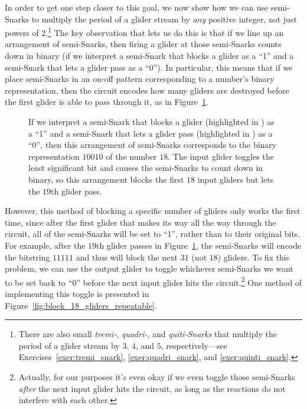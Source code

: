 In order to get one step closer to this goal, we now show how we can use semi-Snarks to multiply the period of a glider stream by \emph{any} positive integer, not just powers of $2$.\footnote{There are also small \emph{tremi-}, \emph{quadri-}, and \emph{quiti-Snarks} that multiply the period of a glider stream by $3$, $4$, and $5$, respectively---see Exercises~\ref{exer:tremi_snark}, \ref{exer:quadri_snark}, and \ref{exer:quinti_snark}.} The key observation that lets us do this is that if we line up an arrangement of semi-Snarks, then firing a glider at those semi-Snarks counts down in binary (if we interpret a semi-Snark that blocks a glider as a ``1'' and a semi-Snark that lets a glider pass as a ``0''). In particular, this means that if we place semi-Snarks in an on-off pattern corresponding to a number's binary representation, then the circuit encodes how many gliders are destroyed before the first glider is able to pass through it, as in Figure~\ref{fig:block_18_gliders}.

\begin{figure}[!htb]
	\centering
	\caption{If we interpret a semi-Snark that blocks a glider (highlighted in ) as a ``1'' and a semi-Snark that lets a glider pass (highlighted in ) as a ``0'', then this arrangement of semi-Snarks corresponds to the binary representation $10010$ of the number $18$. The input glider toggles the least significant bit and causes the semi-Snarks to count down in binary, so this arrangement blocks the first $18$ input gliders but lets the $19$th glider pass.}
	\label{fig:block_18_gliders}
\end{figure}

However, this method of blocking a specific number of gliders only works the first time, since after the first glider that makes its way all the way through the circuit, all of the semi-Snarks will be set to ``1'', rather than to their original bits. For example, after the $19$th glider passes in Figure~\ref{fig:block_18_gliders}, the semi-Snarks will encode the bitstring $11111$ and thus will block the next $31$ (not $18$) gliders. To fix this problem, we can use the output glider to toggle whichever semi-Snarks we want to be set back to ``0'' before the next input glider hits the circuit.\footnote{Actually, for our purposes it's even okay if we even toggle those semi-Snarks \emph{after} the next input glider hits the circuit, as long as the reactions do not interfere with each other.} One method of implementing this toggle is presented in Figure~\ref{fig:block_18_gliders_repeatable}.

